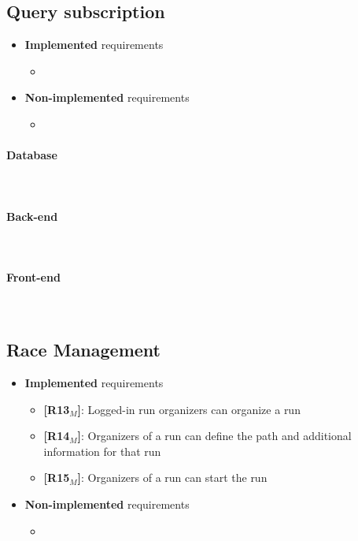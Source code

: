 \subsection{Query subscription}
\begin{itemize}
    \item \textbf{Implemented} requirements
        \begin{itemize}
            \item 
        \end{itemize}
    \item \textbf{Non-implemented} requirements
    \begin{itemize}
            \item 
        \end{itemize}
\end{itemize}


\paragraph{Database} \mbox{}\\  \paragraph{Back-end} \mbox{}\\  \paragraph{Front-end} \mbox{}\\

\subsection{Race Management}
\begin{itemize}
    \item \textbf{Implemented} requirements
        \begin{itemize}
    \item \textbf{[R13$_M$]}: Logged-in run organizers can organize a run
    \item \textbf{[R14$_M$]}: Organizers of a run can define the path and additional information for that run
    \item \textbf{[R15$_M$]}: Organizers of a run can start the run

        \end{itemize}
    \item \textbf{Non-implemented} requirements
    \begin{itemize}
            \item 
        \end{itemize}
\end{itemize}

